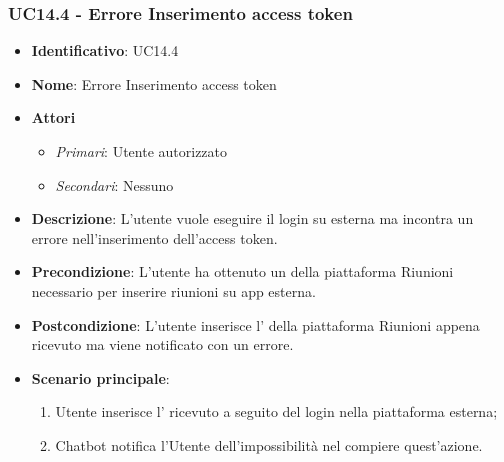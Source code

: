 \subsubsection{UC14.4 - Errore Inserimento access token }
\begin{itemize}
	\item \textbf{Identificativo}: UC14.4
	\item \textbf{Nome}: Errore Inserimento access token
	\item \textbf{Attori}
	\begin{itemize} 
		\item \textit{Primari}: Utente autorizzato
		\item \textit{Secondari}: Nessuno
	\end{itemize}
	\item \textbf{Descrizione}: L'utente vuole eseguire il login su  esterna ma incontra un errore nell'inserimento dell'access token.
	\item \textbf{Precondizione}: L'utente ha ottenuto un  della piattaforma Riunioni necessario per inserire riunioni su app esterna.
	\item \textbf{Postcondizione}: L'utente inserisce l' della piattaforma Riunioni appena ricevuto ma viene notificato con un errore.
	\item \textbf{Scenario principale}: \begin{enumerate}
		\item Utente inserisce l' ricevuto a seguito del login nella piattaforma esterna; 
		\item Chatbot notifica l'Utente dell'impossibilità nel compiere quest'azione.
	\end{enumerate}
\end{itemize}